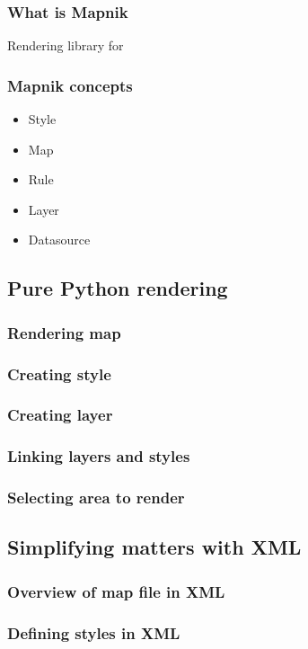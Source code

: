 \documentclass{beamer}
\begin{document}
\begin{frame}
  \frametitle{What is Mapnik}
  Rendering library for
\end{frame}

\begin{frame}
  \frametitle{Mapnik concepts}
  \begin{itemize}
  \item Style
  \item Map
  \item Rule
  \item Layer
  \item Datasource
  \end{itemize}
\end{frame}

\subsection{Pure Python rendering}

\begin{frame}
  \frametitle{Rendering map}

\end{frame}


\begin{frame}
  \frametitle{Creating style}

\end{frame}

\begin{frame}
  \frametitle{Creating layer}

\end{frame}

\begin{frame}
  \frametitle{Linking layers and styles}

\end{frame}

\begin{frame}
  \frametitle{Selecting area to render}

\end{frame}

\subsection{Simplifying matters with XML}

\begin{frame}
  \frametitle{Overview of map file in XML}

\end{frame}

\begin{frame}
  \frametitle{Defining styles in XML}

\end{frame}
\end{document}
